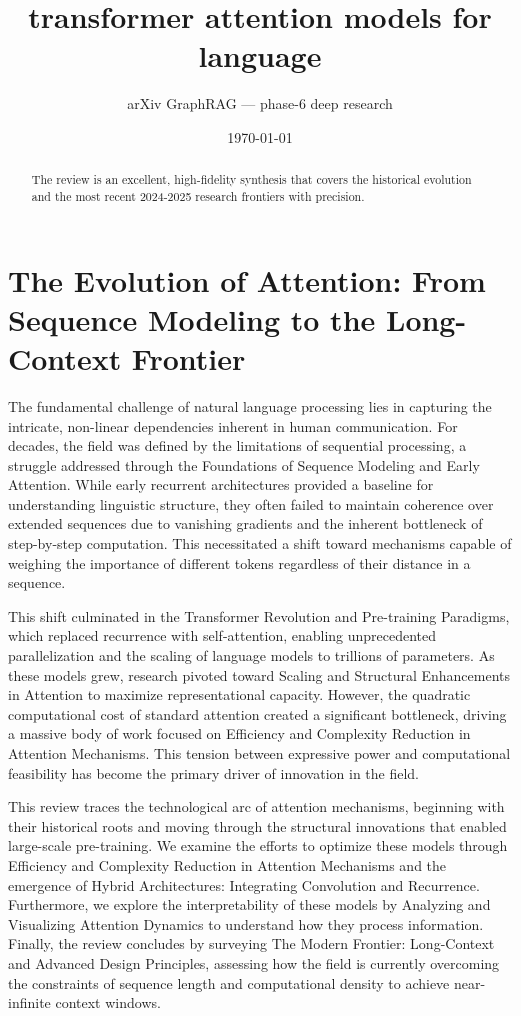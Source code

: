 \documentclass[11pt]{article}
\title{transformer attention models for language}
\author{arXiv GraphRAG --- phase-6 deep research}
\date{\today}
\begin{document}
\maketitle

\begin{abstract}
The review is an excellent, high-fidelity synthesis that covers the historical evolution and the most recent 2024-2025 research frontiers with precision.
\end{abstract}

\section{The Evolution of Attention: From Sequence Modeling to the Long-Context Frontier}

The fundamental challenge of natural language processing lies in capturing the intricate, non-linear dependencies inherent in human communication. For decades, the field was defined by the limitations of sequential processing, a struggle addressed through the Foundations of Sequence Modeling and Early Attention. While early recurrent architectures provided a baseline for understanding linguistic structure, they often failed to maintain coherence over extended sequences due to vanishing gradients and the inherent bottleneck of step-by-step computation. This necessitated a shift toward mechanisms capable of weighing the importance of different tokens regardless of their distance in a sequence.

This shift culminated in the Transformer Revolution and Pre-training Paradigms, which replaced recurrence with self-attention, enabling unprecedented parallelization and the scaling of language models to trillions of parameters. As these models grew, research pivoted toward Scaling and Structural Enhancements in Attention to maximize representational capacity. However, the quadratic computational cost of standard attention created a significant bottleneck, driving a massive body of work focused on Efficiency and Complexity Reduction in Attention Mechanisms. This tension between expressive power and computational feasibility has become the primary driver of innovation in the field.

This review traces the technological arc of attention mechanisms, beginning with their historical roots and moving through the structural innovations that enabled large-scale pre-training. We examine the efforts to optimize these models through Efficiency and Complexity Reduction in Attention Mechanisms and the emergence of Hybrid Architectures: Integrating Convolution and Recurrence. Furthermore, we explore the interpretability of these models by Analyzing and Visualizing Attention Dynamics to understand how they process information. Finally, the review concludes by surveying The Modern Frontier: Long-Context and Advanced Design Principles, assessing how the field is currently overcoming the constraints of sequence length and computational density to achieve near-infinite context windows.
\end{document}
